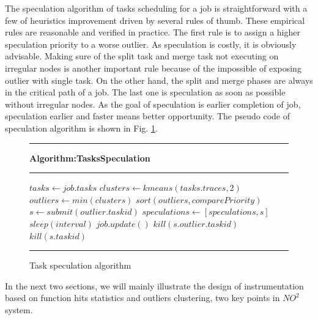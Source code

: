 The speculation algorithm of tasks scheduling for a job is straightforward with a few of
heuristics improvement driven by several rules of thumb. These empirical rules are
reasonable and verified in practice. The first rule is to assign a higher speculation
priority to a worse outlier. As speculation is costly, it is obviously advisable. Making
sure of the split task and merge task not executing on irregular nodes is another
important rule because of the impossible of exposing outlier with single task. On the
other hand, the split and merge phases are always in the critical path of a job. The last
one is speculation as soon as possible without irregular nodes. As the goal of speculation
is earlier completion of job, speculation earlier and faster means better opportunity. The
pseudo code of speculation algorithm is shown in Fig. \ref{fig-spec-algo}.

\begin{figure}
\rule[-.2pt]{0.9\columnwidth}{0.9pt}
\textbf{Algorithm:TasksSpeculation}
\rule[-.2pt]{0.9\columnwidth}{0.5pt}

\begin{algorithmic}[1]

    \State $tasks\gets job.tasks$
    \State $clusters\gets kmeans(tasks.traces, 2)$
        \State $outliers\gets min(clusters)$
        \State $sort(outliers, comparePriority)$
            \State $s\gets submit(outlier.taskid)$
            \State $speculations\gets [speculations, s]$
        \EndFor
    \EndIf
    \State $sleep(interval)$
    \State $job.update()$
            \State $kill(s.outlier.taskid)$
            \State $kill(s.taskid)$
        \EndIf
    \EndFor
\EndWhile\label{specendwhile}
\end{algorithmic}
\rule[-.2pt]{0.9\columnwidth}{0.8pt}
\caption{Task speculation algorithm}\label{fig-spec-algo}
\end{figure}

In the next two sections, we will mainly illustrate the design of instrumentation based on
function hits statistics and outliers clustering, two key points in $NO^2$ system. 